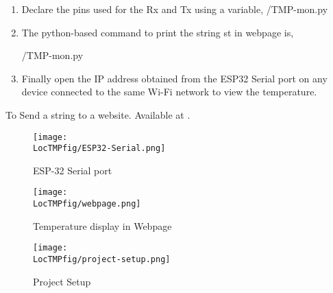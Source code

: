 \begin{enumerate}
\item Declare the pins used for the Rx and Tx using a variable, 
        {\LocTMPpycode/TMP-mon.py} 
        
\item The python-based command to print the string st in webpage
is,

{\LocTMPpycode/TMP-mon.py} 
\item Finally open the IP address obtained from the ESP32 Serial
port on any device connected to the same Wi-Fi network to view
the temperature.
\end{enumerate}

\begin{pycode}
  {To Send a string to a website. Available at
    .}
  \label{py:esp}
  
\end{pycode}

\begin{figure}
  \centering
\texttt{[image: \\LocTMPfig/ESP32-Serial.png]}  \caption{ESP-32 Serial port}
\end{figure}

\begin{figure}
  \centering
  \texttt{[image: \\LocTMPfig/webpage.png]}
  \caption{Temperature display in Webpage}
\end{figure}

\begin{figure}
  \centering
\texttt{[image: \\LocTMPfig/project-setup.png]}  \caption{Project Setup}
\end{figure}